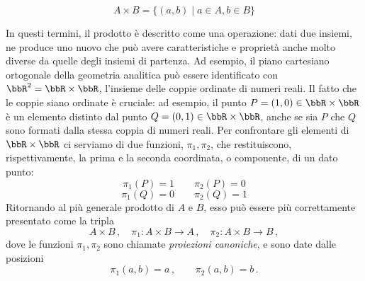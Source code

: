 \[
	A\times B= \{(a,b)\mid a\in A, b\in B\}
\]

In questi termini, il prodotto è descritto come una operazione: dati due insiemi, ne produce uno nuovo che può avere caratteristiche e proprietà anche molto diverse da quelle degli insiemi di partenza. Ad esempio, il piano cartesiano ortogonale della geometria analitica può essere identificato con \(\bbR^2=\bbR\times\bbR\), l'insieme delle coppie ordinate di numeri reali. Il fatto che le coppie siano ordinate è cruciale: ad esempio, il punto \(P=(1,0)\in \bbR\times\bbR\) è un elemento distinto dal punto \(Q=(0,1)\in \bbR\times\bbR\), anche se sia \(P\) che \(Q\) sono formati dalla stessa coppia di numeri reali. Per confrontare gli elementi di \(\bbR\times\bbR\) ci serviamo di due funzioni, \(\pi_1,\pi_2\), che restituiscono, rispettivamente, la prima e la seconda coordinata, o componente, di un dato punto:
\[
	\pi_1(P)=1\qquad \pi_2(P)=0
\]
\[
	\pi_1(Q)=0\qquad \pi_2(Q)=1
\]
Ritornando al più generale prodotto di \(A\) e \(B\), esso può essere più correttamente presentato come la tripla
\[
	A\times B\,,\quad \pi_1\colon A\times B\to A\,,\quad \pi_2\colon A\times B\to B\,,
\]
dove le funzioni \(\pi_1,\pi_2\) sono chiamate \emph{proiezioni canoniche}, e sono date dalle posizioni
\[
	\pi_1(a,b)=a\,,\qquad \pi_2(a,b)=b\,.
\]

